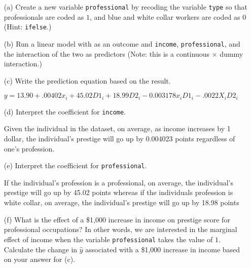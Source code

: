 \documentclass[12pt,letterpaper]{article}
\begin{document}
\newpage
\begin{enumerate}
	
	\item [(a)]
	Create a new variable \texttt{professional} by recoding the variable \texttt{type} so that professionals are coded as $1$, and blue and white collar workers are coded as $0$ (Hint: \texttt{ifelse}.)
	
	\vspace{2cm}
	
	
	\item [(b)]
	Run a linear model with  as an outcome and \texttt{income}, \texttt{professional}, and the interaction of the two as predictors (Note: this is a continuous $\times$ dummy interaction.)
	
	
	\vspace{2cm}
	\item [(c)]
	Write the prediction equation based on the result.
\vspace{.5cm}

	$y = 13.90 + .00402x_{i} + 45.02D1_{i} + 18.99D2_{i} - 0.003178x_{i}D1_{i}- .0022X_{i}D2_{i}$
	
	\item [(d)]
	Interpret the coefficient for \texttt{income}.
	
	
Given the individual in the dataset, on average, as income increases by 1 dollar, the individual's prestige will go up by 0.004023 points regardless of one's profession.
	\vspace{2cm}	
	\item [(e)]
	Interpret the coefficient for \texttt{professional}.
	
	
If the individual's profession is a professional, on average, the individual's prestige will go up by 45.02 points whereas if the individuals profession is white collar, on average, the individual's prestige will go up by 18.98 points

	\newpage
	\item [(f)]
	What is the effect of a \$1,000 increase in income on prestige score for professional occupations? In other words, we are interested in the marginal effect of income when the variable \texttt{professional} takes the value of $1$. Calculate the change in $\hat{y}$ associated with a \$1,000 increase in income based on your answer for (c).
	
	
	

\end{enumerate}
\end{document}

